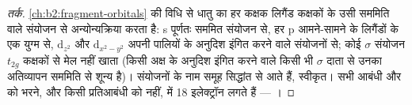 \begin{proof}[तर्क]
\cref{ch:b2:fragment-orbitals} की  विधि से धातु का हर कक्षक
लिगैंड कक्षकों के उसी सममिति वाले संयोजन से अन्योन्यक्रिया करता है: s पूर्णतः
सममित संयोजन से, हर p आमने-सामने के लिगैंडों के एक युग्म से, $\mathrm d_{z^2}$ और $\mathrm
d_{x^2-y^2}$ अपनी पालियों के अनुदिश इंगित करने वाले संयोजनों से; कोई $\sigma$ संयोजन
$t_{2g}$ कक्षकों से मेल नहीं खाता (किसी अक्ष के अनुदिश इंगित करने वाले किसी भी $\sigma$ दाता से उनका अतिव्यापन
सममिति से शून्य है)। संयोजनों के नाम समूह सिद्धांत से आते हैं, स्वीकृत।
सभी आबंधी और  को भरने, और किसी प्रतिआबंधी को नहीं, में
18 इलेक्ट्रॉन लगते हैं --- ।
\end{proof}

